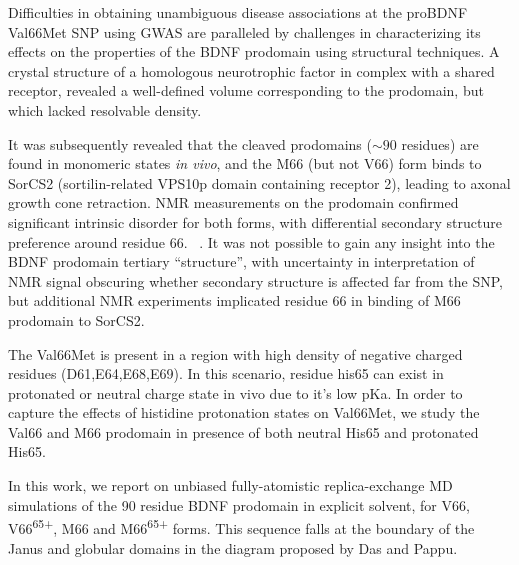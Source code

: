 \documentclass[10pt,letterpaper]{article}
\begin{document}
Difficulties in obtaining unambiguous disease associations at the proBDNF Val66Met SNP using GWAS are paralleled by challenges in characterizing its effects on the properties of the BDNF prodomain using structural techniques.  A crystal structure of a homologous neurotrophic factor in complex with a shared receptor, revealed a well-defined volume corresponding to the prodomain, but which lacked resolvable density.\cite{Feng2010a} 

It was subsequently revealed that the cleaved prodomains ($\sim90$ residues) are found in monomeric states {\it in vivo}, and the M66 (but not V66) form binds to SorCS2 (sortilin-related VPS10p domain containing receptor 2), leading to axonal growth cone retraction.\cite{Anastasia2013} NMR measurements on the prodomain confirmed significant intrinsic disorder for both forms, with differential secondary structure preference around residue 66. ~\cite {Anastasia2013}.  It was not possible to gain any insight into the BDNF prodomain tertiary ``structure'', with uncertainty in interpretation of NMR signal obscuring whether secondary structure is affected far from the SNP, but additional NMR experiments implicated residue 66 in binding of M66 prodomain 
 to SorCS2.~\cite {Anastasia2013}
 
The Val66Met is present in a region with high density of negative charged residues (D61,E64,E68,E69). In this scenario, residue his65 can exist in protonated or neutral charge state in vivo due to it's low pKa. In order to capture the effects of histidine protonation states on Val66Met, we study the Val66 and M66 prodomain in presence of both neutral His65 and protonated His65.

In this work, we report on unbiased fully-atomistic replica-exchange MD simulations of the 90 residue BDNF prodomain in explicit solvent, for V66,   V66\textsuperscript{65+}, M66 and  M66\textsuperscript{65+} forms.  This sequence falls at the boundary of the Janus and globular domains in the diagram proposed by Das and Pappu. \cite{Das2015,Das2013a} 


\end{document}
